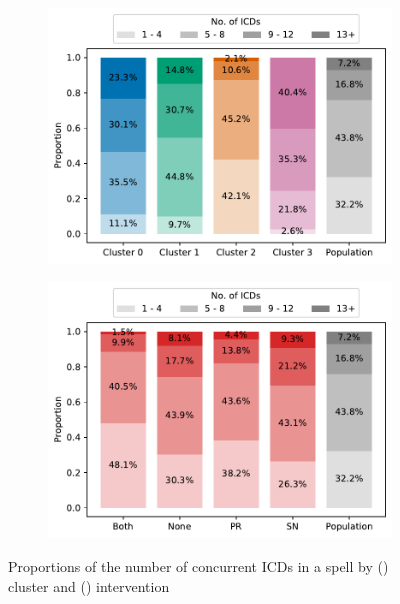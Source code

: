 \begin{figure}
    \centering
    \begin{subfigure}{\imgwidth}
        \includegraphics[width=\linewidth]{cluster_icds}
        \caption{}\label{fig:cluster_icds}
    \end{subfigure}

    \begin{subfigure}{\imgwidth}
        \includegraphics[width=\linewidth]{intervention_icds}
        \caption{}\label{fig:intervention_icds}
    \end{subfigure}
    \caption{%
        Proportions of the number of concurrent ICDs in a spell by
        () cluster and ()
        intervention
    }\label{fig:icds}
\end{figure}

